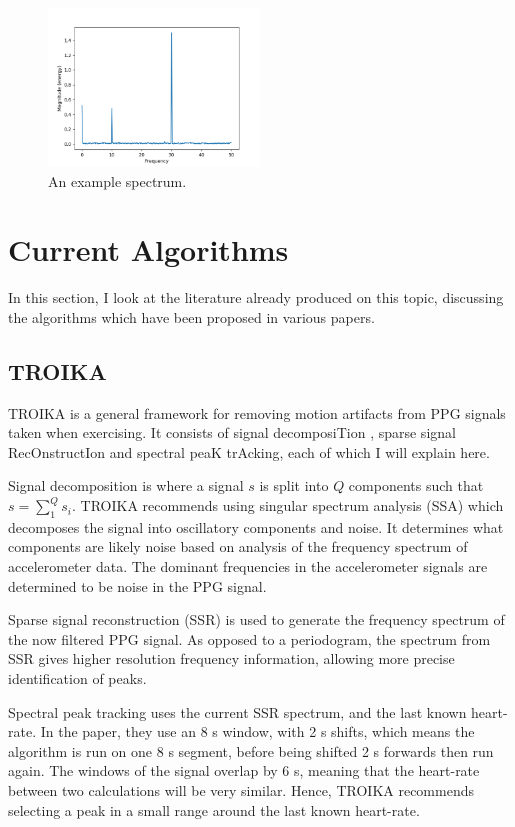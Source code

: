 \documentclass[12pt,a4paper,twoside,openany]{report}
\begin{document}
\begin{figure}[h]
	\centering
	\includegraphics[width=0.5\textwidth]{figs/example-spectrum.png}
	\caption{An example spectrum.}
	\label{fig:example-spectrum}
\end{figure}



\section{Current Algorithms}

In this section, I look at the literature already produced on this topic,
discussing the algorithms which have been proposed in various papers.

\subsection{TROIKA}

TROIKA \cite{Zhang15} is a general framework for removing motion artifacts
from PPG signals taken when exercising. It consists of signal decomposiTion
, sparse signal RecOnstructIon and spectral peaK trAcking, each of which I will
explain here.

Signal decomposition is where a signal \(s\) is split into \(Q\) components
such that $s=\sum_1^Q s_i$. TROIKA recommends using singular spectrum analysis
(SSA) which decomposes the signal into oscillatory components and noise. It
determines what components are likely noise based on analysis of the frequency
spectrum of accelerometer data. The dominant frequencies in the accelerometer
signals are determined to be noise in the PPG signal.

Sparse signal reconstruction (SSR) is used to generate the frequency spectrum of the
now filtered PPG signal. As opposed to a periodogram, the spectrum from SSR
gives higher resolution frequency information, allowing more precise
identification of peaks.

Spectral peak tracking uses the current SSR spectrum, and the last known
heart-rate. In the paper, they use an 8 s window, with 2 s shifts, which means
the algorithm is run on one 8 s segment, before being shifted 2 s forwards then
run again.
The windows of the signal overlap by 6 s, meaning that the heart-rate
between two calculations will be very similar. Hence, TROIKA recommends
selecting a peak in a small range around the last known heart-rate.
\end{document}
